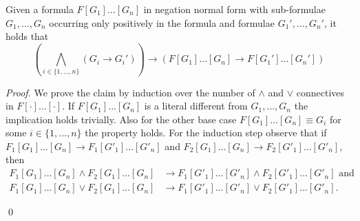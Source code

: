 \begin{lemma}[Monotonicity]\label{lemma:monotonicity}
 Given a formula $F[G_1]\ldots[G_n]$ in negation normal form with
 sub-formulae $G_1,\ldots,G_n$ occurring only positively in
 the formula and formulae $G_1',\ldots,G_n'$, it holds that
 \[\left( \bigwedge_{i\in\{1,\ldots,n\}} (G_i \rightarrow G_i') \right)
   \rightarrow (F[G_1]\ldots[G_n] \rightarrow F[G_1']\ldots[G_n'])\]
\end{lemma}

\begin{techreport}
\begin{proof}
  We prove the claim by induction over the number of $\land$ and $\lor$
  connectives in $F[\cdot]\ldots[\cdot]$.  If $F[G_1]\ldots[G_n]$ is 
  a literal different from $G_1,\ldots,G_n$ the implication holds trivially.
  Also for the other base case $F[G_1]\ldots[G_n]\equiv G_i$ for some
  $i\in\{1,\dots,n\}$ the property holds. For the induction step
  observe that if $F_1[G_1]\ldots[G_n]\rightarrow  F_1[G'_1]\ldots[G'_n]$ and
  $F_2[G_1]\ldots[G_n]\rightarrow  F_2[G'_1]\ldots[G'_n]$, then 
  \begin{align*}
  F_1[G_1]\ldots[G_n] \land F_2[G_1]\ldots[G_n] &\rightarrow
  F_1[G'_1]\ldots[G'_n] \land F_2[G'_1]\ldots[G'_n] \text{ and }\\
  F_1[G_1]\ldots[G_n] \lor F_2[G_1]\ldots[G_n] &\rightarrow 
  F_1[G'_1]\ldots[G'_n] \lor F_2[G'_1]\ldots[G'_n].
  \end{align*}

  \vspace{-20pt}\strut\qed
\end{proof}
\end{techreport}
